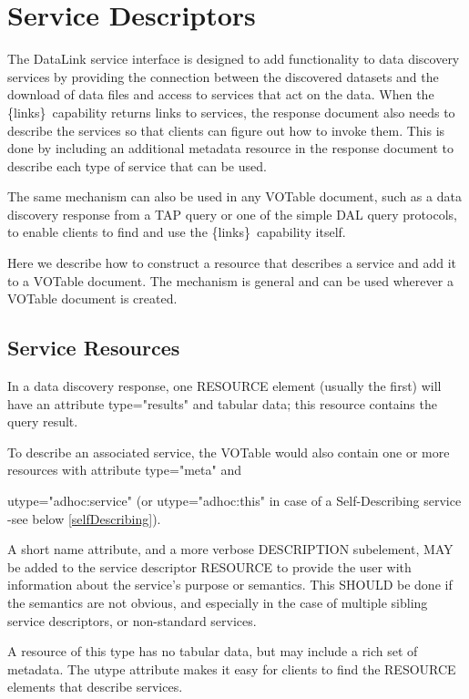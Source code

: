 \documentclass[11pt,a4paper]{ivoa}
\newcommand{\blinks}{\{links\}}
\newcommand{\attval}[2]{#1={\allowbreak}{"}#2{"}}
\begin{document}
\section{Service Descriptors}
\label{sec:serviceDescriptors}

The DataLink service interface is designed to add functionality to data
discovery services by providing the connection between the discovered
datasets and the download of data files and access to services that act
on the data. When the \blinks\ capability returns links to services, the
response document also needs to describe the services so that clients can
figure out how to invoke them. This is done by including an additional
metadata resource in the response document to describe each type of
service that can be used.

The same mechanism can also be used in any VOTable document, such
as a data discovery response from a TAP query or one of the simple
DAL query protocols, to enable clients to find and use the \blinks\
capability itself.

Here we describe how to construct a resource that describes a service
and add it to a VOTable document. The mechanism is general and can be
used wherever a VOTable document is created.


\subsection{Service Resources}
\label{sec:serviceResources}

In a data discovery response, one RESOURCE element (usually the first)
will have an attribute \attval{type}{results} and tabular data; this resource
contains the query result.

To describe an associated service, the VOTable would also
contain one or more resources with attribute \attval{type}{meta} and

\attval{utype}{adhoc:service}  (or \attval{utype}{adhoc:this} in case of a Self-Describing service -see below \ref{selfDescribing}).

A short name attribute, and a more verbose DESCRIPTION  subelement, MAY be added to the service descriptor RESOURCE to  provide the user with information about the service's purpose or  semantics. This SHOULD be done if the semantics are not obvious,  and especially in the case of multiple sibling service  descriptors, or non-standard services.



A resource of this type has no tabular data,
but may include a rich set of metadata. The utype attribute makes it
easy for clients to find the RESOURCE elements that describe services.
\end{document}
